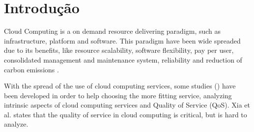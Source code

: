 \documentclass[conference]{IEEEtran}
\begin{document}




%
\IEEEpeerreviewmaketitle



\section{Introdução}


Cloud Computing is a on demand resource delivering paradigm, such as infrastructure, platform and software. This paradigm have been wide spreaded
due to its benefits, like resource scalability, software flexibility, pay per user, consolidated management and maintenance system, reliability 
and reduction of carbon emissions \cite{rehman2011teaching}.


With the spread of the use of cloud computing services, some studies (\cite{soltani2016, garg2011, li2012, 
bardsiri2014, lesun2016, quarati2016}) have been developed in order to help choosing the more fitting service, 
analyzing intrinsic aspects of cloud computing services and Quality of Service (QoS). Xia et al. \cite{xia2013} states that the 
quality of service in cloud computing is critical, but is hard to analyze.
\end{document}
